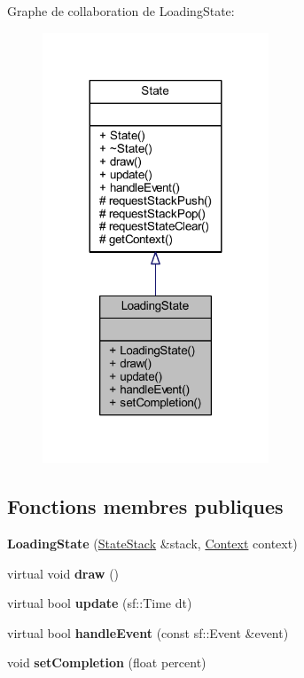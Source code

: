 Graphe de collaboration de Loading\+State\+:\nopagebreak
\begin{figure}[H]
\begin{center}
\leavevmode
\includegraphics[width=191pt]{class_loading_state__coll__graph}
\end{center}
\end{figure}
\subsection*{Fonctions membres publiques}
\begin{DoxyCompactItemize}
\item 
{\bfseries Loading\+State} (\hyperlink{class_state_stack}{State\+Stack} \&stack, \hyperlink{struct_state_1_1_context}{Context} context)\hypertarget{class_loading_state_a6830cacada1f9c215f913d31aa1805cf}{}\label{class_loading_state_a6830cacada1f9c215f913d31aa1805cf}

\item 
virtual void {\bfseries draw} ()\hypertarget{class_loading_state_adfe2c002c52cc2c49967ba3ace4aa73b}{}\label{class_loading_state_adfe2c002c52cc2c49967ba3ace4aa73b}

\item 
virtual bool {\bfseries update} (sf\+::\+Time dt)\hypertarget{class_loading_state_a8f2f50523c1f35e011ddd0839aa66ee4}{}\label{class_loading_state_a8f2f50523c1f35e011ddd0839aa66ee4}

\item 
virtual bool {\bfseries handle\+Event} (const sf\+::\+Event \&event)\hypertarget{class_loading_state_a37da243eeeca36460bac2f32cef3e368}{}\label{class_loading_state_a37da243eeeca36460bac2f32cef3e368}

\item 
void {\bfseries set\+Completion} (float percent)\hypertarget{class_loading_state_a28bee93e7f9818084af8be6b31ee0ba4}{}\label{class_loading_state_a28bee93e7f9818084af8be6b31ee0ba4}

\end{DoxyCompactItemize}
